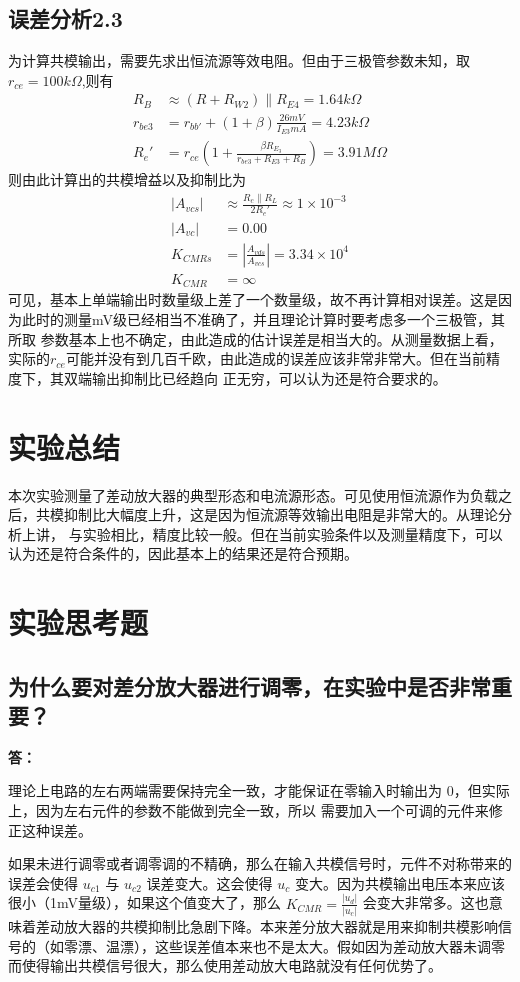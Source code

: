 \documentclass[a4paper,11pt,UTF8]{ctexart}
\newcommand{\p}{\par}
\newcommand{\np}{\par\noindent}
\begin{document}
\subsection{误差分析2.3}
为计算共模输出，需要先求出恒流源等效电阻。但由于三极管参数未知，取$r_{ce}=100k\Omega$,则有
\begin{equation}
  \begin{aligned}
    R_B&\approx(R+R_{W2})\parallel R_{E4}=1.64k\Omega\\
    r_{be3}&=r_{bb'}+(1+\beta)\frac{26mV}{I_{E3}mA}=4.23k\Omega\\
    R_e'&=r_{ce}(1+\frac{\beta R_{E_3}}{r_{be3}+R_{E3}+R_{B}})=3.91M\Omega
  \end{aligned}
\end{equation}
则由此计算出的共模增益以及抑制比为
\begin{equation}
  \begin{aligned}
    \left | A_{vcs}\right |&\approx\frac{R_c\parallel R_L}{2R_e'}\approx1\times10^{-3}\\
    \left | A_{vc}\right |&=0.00\\
    K_{CMRs}&=\left |\frac{A_{vds}}{A_{vcs}}\right |=3.34\times10^{4}\\
    K_{CMR}&=\infty
  \end{aligned}
\end{equation}
可见，基本上单端输出时数量级上差了一个数量级，故不再计算相对误差。这是因为此时的测量mV级已经相当不准确了，并且理论计算时要考虑多一个三极管，其所取
参数基本上也不确定，由此造成的估计误差是相当大的。从测量数据上看，实际的$r_{ce}$可能并没有到几百千欧，由此造成的误差应该非常非常大。但在当前精度下，其双端输出抑制比已经趋向
正无穷，可以认为还是符合要求的。
\section{实验总结}
本次实验测量了差动放大器的典型形态和电流源形态。可见使用恒流源作为负载之后，共模抑制比大幅度上升，这是因为恒流源等效输出电阻是非常大的。从理论分析上讲，
与实验相比，精度比较一般。但在当前实验条件以及测量精度下，可以认为还是符合条件的，因此基本上的结果还是符合预期。
\section{实验思考题}
\subsection{为什么要对差分放大器进行调零，在实验中是否非常重要？}
\np \textbf{答：}
\p 理论上电路的左右两端需要保持完全一致，才能保证在零输入时输出为 0，但实际上，因为左右元件的参数不能做到完全一致，所以 需要加入一个可调的元件来修正这种误差。
\p 如果未进行调零或者调零调的不精确，那么在输入共模信号时，元件不对称带来的误差会使得 $u_{c1}$ 与 $u_{c2}$ 误差变大。这会使得 $u_c$ 变大。因为共模输出电压本来应该很小（1mV量级），如果这个值变大了，那么 $K_{CMR}=\frac{|u_d|}{|u_c|}$ 会变大非常多。这也意味着差动放大器的共模抑制比急剧下降。本来差分放大器就是用来抑制共模影响信号的（如零漂、温漂），这些误差值本来也不是太大。假如因为差动放大器未调零而使得输出共模信号很大，那么使用差动放大电路就没有任何优势了。
\end{document}

